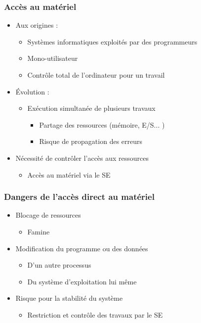 \begin{frame}
\frametitle{Accès au matériel}
\begin{itemize}
\item Aux origines :
\begin{itemize}
\item Systèmes informatiques exploités par des programmeurs
\item Mono-utilisateur
\item Contrôle total de l’ordinateur pour un travail
\end{itemize}
\item Évolution :
\begin{itemize}
\item Exécution simultanée de plusieurs travaux
\begin{itemize}
\item Partage des ressources (mémoire, E/S... )
\item Risque de propagation des erreurs
\end{itemize}
\end{itemize}
\item Nécessité de contrôler l'accès aux ressources
\begin{itemize}
\item Accès au matériel via le SE
\end{itemize}
\end{itemize}
\end{frame}


\begin{frame}
 \frametitle{Dangers de l’accès direct au matériel}
 \begin{itemize}
 \item Blocage de ressources
\begin{itemize}
\item Famine
\end{itemize}
\item Modification du programme ou des données
\begin{itemize}
\item D’un autre processus
\item Du système d’exploitation lui même
\end{itemize}
\item Risque pour la stabilité du système
\begin{itemize}
\item Restriction et contrôle des travaux par le SE
\end{itemize}
 \end{itemize}
\end{frame}


